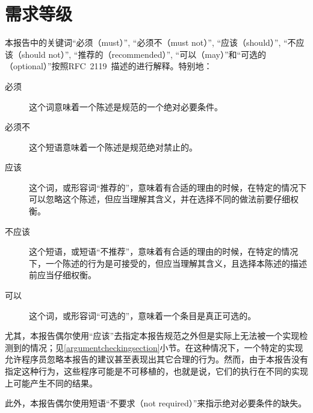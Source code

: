 \chapter{需求等级}
\label{requirementchapter}

本报告中的关键词“必须（must）”, “必须不（must not）”, “应该（should）”, “不应该（should not）”, “推荐的（recommended）”, “可以（may）”和“可选的（optional）”按照RFC~2119~\cite{mustard}描述的进行解释。特别地：

\begin{description}
\item[必须] 这个词意味着一个陈述是规范的一个绝对必要条件。
\item[必须不] 这个短语意味着一个陈述是规范绝对禁止的。
\item[应该] 这个词，或形容词“推荐的”，意味着有合适的理由的时候，在特定的情况下可以忽略这个陈述，但应当理解其含义，并在选择不同的做法前要仔细权衡。
\item[不应该] 这个短语，或短语“不推荐”，意味着有合适的理由的时候，在特定的情况下，一个陈述的行为是可接受的，但应当理解其含义，且选择本陈述的描述前应当仔细权衡。
\item[可以] 这个词，或形容词“可选的”，意味着一个条目是真正可选的。
\end{description}

尤其，本报告偶尔使用“应该”去指定本报告规范之外但是实际上无法被一个实现检测到的情况；见\ref{argumentcheckingsection}小节。在这种情况下，一个特定的实现允许程序员忽略本报告的建议甚至表现出其它合理的行为。然而，由于本报告没有指定这种行为，这些程序可能是不可移植的，也就是说，它们的执行在不同的实现上可能产生不同的结果。

此外，本报告偶尔使用短语“不要求（not required）”来指示绝对必要条件的缺失。

